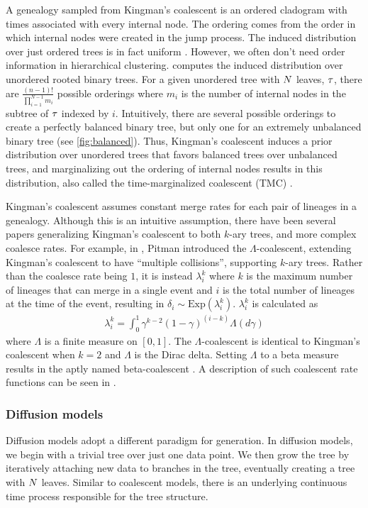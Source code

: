 A genealogy sampled from Kingman's coalescent
is an ordered cladogram with times associated with every internal node.
The ordering comes from the order in which
internal nodes were created in the jump process.
The induced distribution over just ordered trees
is in fact uniform \citep{Teh2009}.
However, we often don't need order information
in hierarchical clustering.
\citet{Boyles2012} computes the induced distribution over
unordered rooted binary trees.
For a given unordered tree with $N$ leaves, $\tau$,
there are $\frac{(n - 1)!}{\prod_{i = 1}^{N - 1}m_i}$ possible orderings
where $m_i$ is the number of internal nodes in the subtree
of $\tau$ indexed by $i$. 
Intuitively, there
are several possible orderings to create a perfectly balanced binary tree,
but only one for an extremely unbalanced binary tree (see \autoref{fig:balanced}).
Thus, Kingman's coalescent induces a prior distribution
over unordered trees
that favors balanced trees over unbalanced trees,
and 
marginalizing out the ordering of internal
nodes results in this distribution, also called
the time-marginalized coalescent (TMC) \citep{Boyles2012}.

Kingman's coalescent assumes constant merge rates
for each pair of lineages in a genealogy. 
Although this is an intuitive assumption,
there have been several papers generalizing Kingman's coalescent
to both $k$-ary trees, and more complex coalesce rates.
For example, in \citet{Pitman1999}, Pitman introduced the
$\Lambda$-coalescent, extending Kingman's coalescent
to have ``multiple collisions'', supporting
$k$-ary trees.
Rather than the coalesce rate
being $1$, it is instead $\lambda_i^k$
where $k$ is the maximum number of lineages
that can merge in a single event and $i$ is the total number
of lineages at the time of the event, resulting in $\delta_i \sim \text{Exp}(\lambda_i^k)$. $\lambda_i^k$ is calculated as
\begin{align}
  \lambda_i^k = \int_0^1 \gamma^{k - 2}(1 - \gamma)^{(i-k)}\Lambda(d\gamma)
\end{align}
where $\Lambda$ is a finite measure on $[0, 1]$. The
$\Lambda$-coalescent is identical to Kingman's coalescent
when $k = 2$ and $\Lambda$ is the Dirac delta.
Setting $\Lambda$ to a beta measure
results in the aptly named beta-coalescent \citep{Hu2013}.
A description of such coalescent rate functions
can be seen in \citet{Aldous1999}.

\subsubsection*{Diffusion models}
Diffusion models adopt a different paradigm for generation.
In diffusion models, we begin with a
trivial tree over just one data point. We then
grow the tree by iteratively attaching new data
to branches in the tree, eventually creating
a tree with $N$ leaves.
Similar to coalescent models, there is an underlying
continuous time process responsible for
the tree structure.

